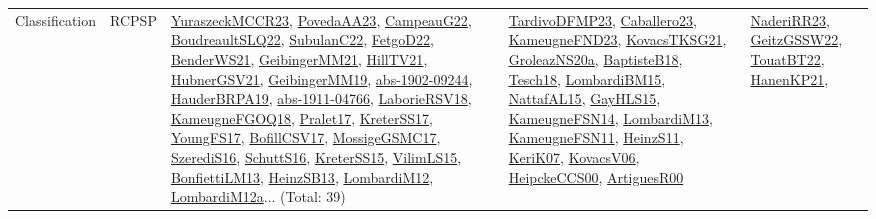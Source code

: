 {\begin{longtable}{lp{3cm}>{\raggedright}p{6cm}>{\raggedright}p{6cm}p{8cm}}
Classification & RCPSP & \href{articles/YuraszeckMCCR23.pdf}{YuraszeckMCCR23}\cite{YuraszeckMCCR23}, \href{papers/PovedaAA23.pdf}{PovedaAA23}\cite{PovedaAA23}, \href{articles/CampeauG22.pdf}{CampeauG22}\cite{CampeauG22}, \href{papers/BoudreaultSLQ22.pdf}{BoudreaultSLQ22}\cite{BoudreaultSLQ22}, \href{articles/SubulanC22.pdf}{SubulanC22}\cite{SubulanC22}, \href{articles/FetgoD22.pdf}{FetgoD22}\cite{FetgoD22}, \href{papers/BenderWS21.pdf}{BenderWS21}\cite{BenderWS21}, \href{papers/GeibingerMM21.pdf}{GeibingerMM21}\cite{GeibingerMM21}, \href{papers/HillTV21.pdf}{HillTV21}\cite{HillTV21}, \href{articles/HubnerGSV21.pdf}{HubnerGSV21}\cite{HubnerGSV21}, \href{papers/GeibingerMM19.pdf}{GeibingerMM19}\cite{GeibingerMM19}, \href{articles/abs-1902-09244.pdf}{abs-1902-09244}\cite{abs-1902-09244}, \href{articles/HauderBRPA19.pdf}{HauderBRPA19}\cite{HauderBRPA19}, \href{articles/abs-1911-04766.pdf}{abs-1911-04766}\cite{abs-1911-04766}, \href{articles/LaborieRSV18.pdf}{LaborieRSV18}\cite{LaborieRSV18}, \href{papers/KameugneFGOQ18.pdf}{KameugneFGOQ18}\cite{KameugneFGOQ18}, \href{papers/Pralet17.pdf}{Pralet17}\cite{Pralet17}, \href{articles/KreterSS17.pdf}{KreterSS17}\cite{KreterSS17}, \href{papers/YoungFS17.pdf}{YoungFS17}\cite{YoungFS17}, \href{papers/BofillCSV17.pdf}{BofillCSV17}\cite{BofillCSV17}, \href{papers/MossigeGSMC17.pdf}{MossigeGSMC17}\cite{MossigeGSMC17}, \href{papers/SzerediS16.pdf}{SzerediS16}\cite{SzerediS16}, \href{papers/SchuttS16.pdf}{SchuttS16}\cite{SchuttS16}, \href{papers/KreterSS15.pdf}{KreterSS15}\cite{KreterSS15}, \href{papers/VilimLS15.pdf}{VilimLS15}\cite{VilimLS15}, \href{papers/BonfiettiLM13.pdf}{BonfiettiLM13}\cite{BonfiettiLM13}, \href{articles/HeinzSB13.pdf}{HeinzSB13}\cite{HeinzSB13}, \href{articles/LombardiM12.pdf}{LombardiM12}\cite{LombardiM12}, \href{articles/LombardiM12a.pdf}{LombardiM12a}\cite{LombardiM12a}... (Total: 39) & \href{papers/TardivoDFMP23.pdf}{TardivoDFMP23}\cite{TardivoDFMP23}, \href{articles/Caballero23.pdf}{Caballero23}\cite{Caballero23}, \href{papers/KameugneFND23.pdf}{KameugneFND23}\cite{KameugneFND23}, \href{papers/KovacsTKSG21.pdf}{KovacsTKSG21}\cite{KovacsTKSG21}, \href{papers/GroleazNS20a.pdf}{GroleazNS20a}\cite{GroleazNS20a}, \href{articles/BaptisteB18.pdf}{BaptisteB18}\cite{BaptisteB18}, \href{papers/Tesch18.pdf}{Tesch18}\cite{Tesch18}, \href{papers/LombardiBM15.pdf}{LombardiBM15}\cite{LombardiBM15}, \href{articles/NattafAL15.pdf}{NattafAL15}\cite{NattafAL15}, \href{papers/GayHLS15.pdf}{GayHLS15}\cite{GayHLS15}, \href{articles/KameugneFSN14.pdf}{KameugneFSN14}\cite{KameugneFSN14}, \href{papers/LombardiM13.pdf}{LombardiM13}\cite{LombardiM13}, \href{papers/KameugneFSN11.pdf}{KameugneFSN11}\cite{KameugneFSN11}, \href{papers/HeinzS11.pdf}{HeinzS11}\cite{HeinzS11}, \href{papers/KeriK07.pdf}{KeriK07}\cite{KeriK07}, \href{papers/KovacsV06.pdf}{KovacsV06}\cite{KovacsV06}, \href{articles/HeipckeCCS00.pdf}{HeipckeCCS00}\cite{HeipckeCCS00}, \href{articles/ArtiguesR00.pdf}{ArtiguesR00}\cite{ArtiguesR00} & \href{articles/NaderiRR23.pdf}{NaderiRR23}\cite{NaderiRR23}, \href{papers/GeitzGSSW22.pdf}{GeitzGSSW22}\cite{GeitzGSSW22}, \href{papers/TouatBT22.pdf}{TouatBT22}\cite{TouatBT22}, \href{papers/HanenKP21.pdf}{HanenKP21}\cite{HanenKP21}, 
\end{longtable}}
